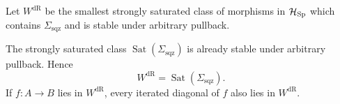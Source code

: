 \begin{definition}
Let \(W^{\mathrm{dR}}\) be the smallest strongly saturated class of morphisms in
\(\mathcal H_{\operatorname{Sp}}\) which contains \(\Sigma_{\mathrm{sqz}}\) and is
stable under arbitrary pullback.
\end{definition}

\begin{lemma}
\label{lem:generated-congruence}
The strongly saturated class \(\operatorname{Sat}(\Sigma_{\mathrm{sqz}})\) is
already stable under arbitrary pullback. Hence
\[
  W^{\mathrm{dR}}
  =
  \operatorname{Sat}(\Sigma_{\mathrm{sqz}}).
\]
If \(f:A\to B\) lies in \(W^{\mathrm{dR}}\), every iterated diagonal of \(f\)
also lies in \(W^{\mathrm{dR}}\).
\end{lemma}

